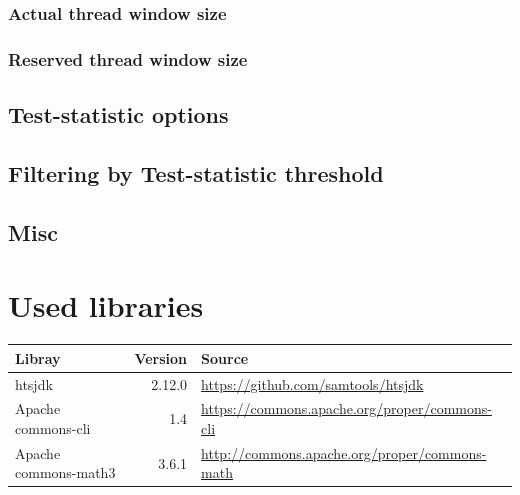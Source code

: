 \documentclass[10pt,a4paper]{article}
\begin{document}
\subsubsection{Actual thread window size}

\subsubsection{Reserved thread window size}

%
\subsection{Test-statistic options}


\subsection{Filtering by Test-statistic threshold}
\subsection{Misc}


\section{Used libraries}
\begin{tabular}{lrl}
\bf{Libray} & \bf{Version} & \bf{Source} \\
\hline
htsjdk & 2.12.0 & \url{https://github.com/samtools/htsjdk} \\
Apache commons-cli & 1.4 & \url{https://commons.apache.org/proper/commons-cli} \\
Apache commons-math3 & 3.6.1 & \url{http://commons.apache.org/proper/commons-math}
\end{tabular}


\end{document}

